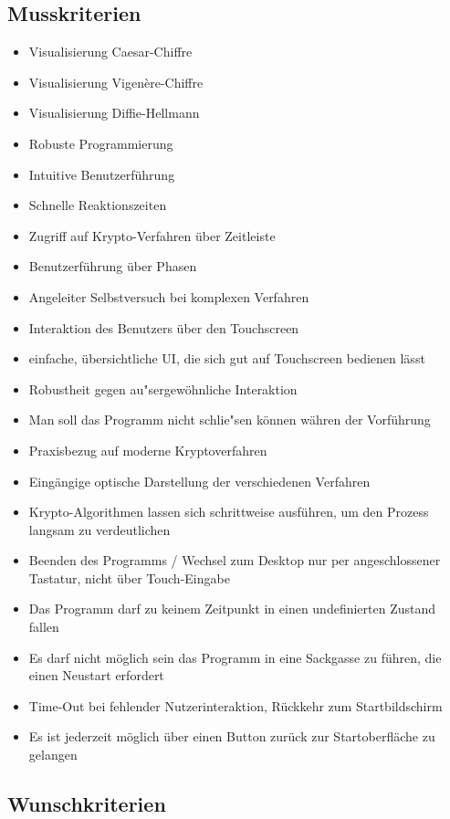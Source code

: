 \documentclass{article}
\begin{document}
\subsection{Musskriterien}

\begin{itemize}
    \item Visualisierung Caesar-Chiffre
    \item Visualisierung Vigenère-Chiffre
    \item Visualisierung Diffie-Hellmann
    \item Robuste Programmierung
    \item Intuitive Benutzerführung
    \item Schnelle Reaktionszeiten
    \item Zugriff auf Krypto-Verfahren über Zeitleiste
    \item Benutzerführung über Phasen
    \item Angeleiter Selbstversuch bei komplexen Verfahren
    \item Interaktion des Benutzers über den Touchscreen
    \item einfache, übersichtliche UI, die sich gut auf Touchscreen bedienen lässt
    \item Robustheit gegen au"sergewöhnliche Interaktion
    \item Man soll das Programm nicht schlie"sen können währen der Vorführung
    \item Praxisbezug auf moderne Kryptoverfahren
    \item Eingängige optische Darstellung der verschiedenen Verfahren
    \item Krypto-Algorithmen lassen sich schrittweise ausführen, um den Prozess
        langsam zu verdeutlichen
    \item Beenden des Programms / Wechsel zum Desktop nur per angeschlossener Tastatur, nicht über Touch-Eingabe
    \item Das Programm darf zu keinem Zeitpunkt in einen undefinierten Zustand fallen
    \item Es darf nicht möglich sein das Programm in eine Sackgasse zu führen, die einen Neustart erfordert
    \item Time-Out bei fehlender Nutzerinteraktion, Rückkehr zum Startbildschirm
    \item Es ist jederzeit möglich über einen Button zurück zur Startoberfläche zu gelangen
\end{itemize}

\subsection{Wunschkriterien}
\end{document}
